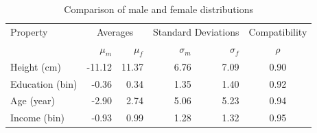 \documentclass[journal,comsoc]{IEEEtran}
\begin{document}


\begin{table}%
\caption{Comparison of male and female distributions}
\begin{center}
\begin{tabular*}{\hsize}{@{\extracolsep{\fill}}lrrrrc}
\hline
Property
&\multicolumn{2}{c}{Averages}
&\multicolumn{2}{c}{Standard Deviations}
&Compatibility\\
% 
&$\mu_{m}$
&$\mu_{f}$
&$\sigma_{m}$
&$\sigma_{f}$
&$\rho$\\
%
\hline
%
Height (cm)		
&-11.12 
&11.37 
&6.76
&7.09
&0.90\\
%
Education (bin)
&-0.36
&0.34
&1.35
&1.40
&0.92\\
%
Age (year)			
&-2.90
&2.74
&5.06
&5.23
&0.94\\
%
Income (bin)
&-0.93
&0.99
&1.28
&1.32
&0.95\\
\hline
\end{tabular*}
\end{center}
\label{tbl:statistics}
\end{table}
\end{document}
